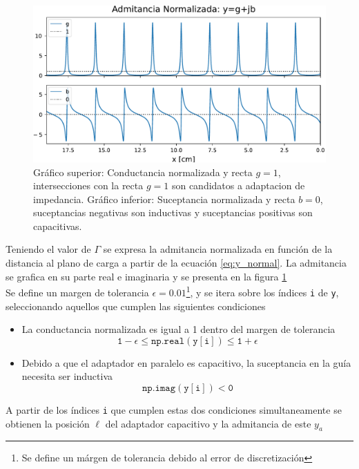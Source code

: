 \documentclass[11pt,a4paper]{article}
\begin{document}
\begin{appendices}
\begin{multicols}{2}
    \begin{figure}[H]
        \centering
        \includegraphics[width=\linewidth]{Images/ydex.pdf}
        \caption{Gráfico superior: Conductancia normalizada y recta $g=1$, intersecciones con la recta $g=1$ son candidatos a adaptacion de impedancia.
            Gráfico inferior: Suceptancia normalizada y recta $b=0$, suceptancias negativas son inductivas y suceptancias positivas son capacitivas.}
        \label{fig:ydex}
    \end{figure}
    Teniendo el valor de $\Gamma$ se expresa la admitancia normalizada en función de la distancia al plano de carga a partir de la ecuación \ref{eq:y_normal}. La admitancia se grafica en su parte real e imaginaria y se presenta en la figura \ref{fig:ydex}\\

    Se define un margen de tolerancia $\epsilon = 0.01$\footnote{Se define un márgen de tolerancia debido al error de discretización}, y se itera sobre los índices \texttt{i} de \texttt{y}, seleccionando aquellos que cumplen las siguientes condiciones

    \begin{itemize}
        \item La conductancia normalizada es igual a 1 dentro del margen de tolerancia
        $$\mathtt{ 1-\epsilon \le np.real(y[i]) \le  1+\epsilon}$$
        \item Debido a que el adaptador en paralelo es capacitivo, la suceptancia en la guía necesita ser inductiva
        $$\mathtt{np.imag(y[i])< 0}$$
    \end{itemize}

    A partir de los índices \texttt{i} que cumplen estas dos condiciones simultaneamente se obtienen la posición $\ell$ del adaptador capacitivo y la admitancia de este $y_a$ 
    

\end{multicols}
\end{appendices}
\end{document}
